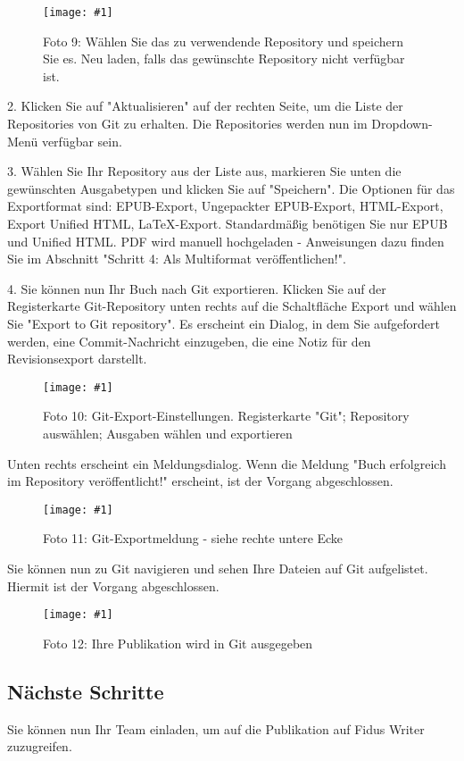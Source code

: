 \documentclass{article}
\newlength{\imgwidth}
\newcommand\scaledgraphics[2]{%
                
\settowidth{\imgwidth}{\texttt{[image: \#1]}}%
                
\setlength{\imgwidth}{\minof{\imgwidth}{#2\textwidth}}%
                
\texttt{[image: \#1]}%
                
}
\begin{document}
\begin{figure}
\scaledgraphics{03dc5c4f-e517-4c5e-89e2-c58d03d72a7b.png}{1}
\caption*{Foto 9: Wählen Sie das zu verwendende Repository und speichern Sie es. Neu laden, falls das gewünschte Repository nicht verfügbar ist.}\label{F97152971}
\end{figure}


2. Klicken Sie auf "Aktualisieren" auf der rechten Seite, um die Liste der Repositories von Git zu erhalten. Die Repositories werden nun im Dropdown-Menü verfügbar sein.


3. Wählen Sie Ihr Repository aus der Liste aus, markieren Sie unten die gewünschten Ausgabetypen und klicken Sie auf "Speichern". Die Optionen für das Exportformat sind: EPUB-Export, Ungepackter EPUB-Export, HTML-Export, Export Unified HTML, LaTeX-Export. Standardmäßig benötigen Sie nur EPUB und Unified HTML. PDF wird manuell hochgeladen - Anweisungen dazu finden Sie im Abschnitt "Schritt 4: Als Multiformat veröffentlichen!".


4. Sie können nun Ihr Buch nach Git exportieren. Klicken Sie auf der Registerkarte Git-Repository unten rechts auf die Schaltfläche Export und wählen Sie "Export to Git repository". Es erscheint ein Dialog, in dem Sie aufgefordert werden, eine Commit-Nachricht einzugeben, die eine Notiz für den Revisionsexport darstellt.

\begin{figure}
\scaledgraphics{e8845c51-1622-4ec7-aa72-ee8b7e6abe4f.png}{1}
\caption*{Foto 10: Git-Export-Einstellungen. Registerkarte "Git"; Repository auswählen; Ausgaben wählen und exportieren}\label{F11208021}
\end{figure}


Unten rechts erscheint ein Meldungsdialog. Wenn die Meldung "Buch erfolgreich im Repository veröffentlicht!" erscheint, ist der Vorgang abgeschlossen.

\begin{figure}
\scaledgraphics{de2690fb-664f-4e64-b0fb-3f29b220d4bc.png}{1}
\caption*{Foto 11: Git-Exportmeldung - siehe rechte untere Ecke}\label{F22841151}
\end{figure}


Sie können nun zu Git navigieren und sehen Ihre Dateien auf Git aufgelistet. Hiermit ist der Vorgang abgeschlossen.

\begin{figure}
\scaledgraphics{d80dc5a5-d385-4a3b-a03a-a752ff2686c9.png}{1}
\caption*{Foto 12: Ihre Publikation wird in Git ausgegeben}\label{F82558661}
\end{figure}


\subsection{Nächste Schritte}\label{H526381}



Sie können nun Ihr Team einladen, um auf die Publikation auf Fidus Writer zuzugreifen.
\end{document}
